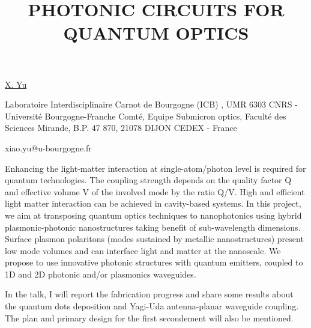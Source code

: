 \title{PHOTONIC CIRCUITS FOR QUANTUM OPTICS}

\underline{X. Yu}  

{\normalsize{\vspace{-4mm}
Laboratoire Interdisciplinaire Carnot de Bourgogne (ICB) ,
UMR 6303 CNRS - Université Bourgogne-Franche Comté,
Equipe Submicron optics,
Faculté des Sciences Mirande,
B.P. 47 870,
21078 DIJON CEDEX - France



\email xiao.yu@u-bourgogne.fr}}

Enhancing the light-matter interaction at single-atom/photon level is required for quantum technologies. The coupling strength depends on the quality factor Q and effective volume V of the involved mode by the ratio Q/V. High and efficient light matter interaction can be achieved in cavity-based systems. In this project, we aim at transposing quantum optics techniques to nanophotonics using hybrid plasmonic-photonic nanostructures taking benefit of sub-wavelength dimensions. Surface plasmon polaritons (modes sustained by metallic nanostructures) present low mode volumes and can interface light and matter at the nanoscale. We propose to use innovative photonic structures with quantum emitters, coupled to 1D and 2D photonic and/or plasmonics waveguides. 

In the talk, I will report the fabrication progress and share some results about the quantum dots deposition and Yagi-Uda antenna-planar waveguide coupling. The plan and primary design for the first secondement will also be mentioned.

\vspace{\baselineskip}